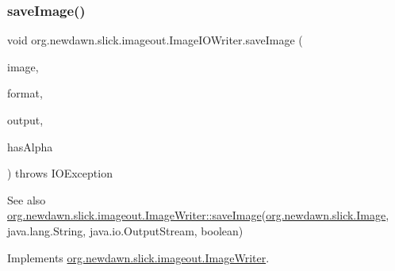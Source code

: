\subsubsection{\texorpdfstring{save\+Image()}{saveImage()}}
{\footnotesize\ttfamily void org.\+newdawn.\+slick.\+imageout.\+Image\+I\+O\+Writer.\+save\+Image (\begin{DoxyParamCaption}\item[{\mbox{\hyperlink{classorg_1_1newdawn_1_1slick_1_1_image}{Image}}}]{image,  }\item[{String}]{format,  }\item[{Output\+Stream}]{output,  }\item[{boolean}]{has\+Alpha }\end{DoxyParamCaption}) throws I\+O\+Exception\hspace{0.3cm}{\ttfamily [inline]}}

\begin{DoxySeeAlso}{See also}
\mbox{\hyperlink{interfaceorg_1_1newdawn_1_1slick_1_1imageout_1_1_image_writer_ad911f19d2f2c9e9925c73510018423b9}{org.\+newdawn.\+slick.\+imageout.\+Image\+Writer\+::save\+Image}}(\mbox{\hyperlink{classorg_1_1newdawn_1_1slick_1_1_image}{org.\+newdawn.\+slick.\+Image}}, java.\+lang.\+String, java.\+io.\+Output\+Stream, boolean) 
\end{DoxySeeAlso}


Implements \mbox{\hyperlink{interfaceorg_1_1newdawn_1_1slick_1_1imageout_1_1_image_writer_ad911f19d2f2c9e9925c73510018423b9}{org.\+newdawn.\+slick.\+imageout.\+Image\+Writer}}.


